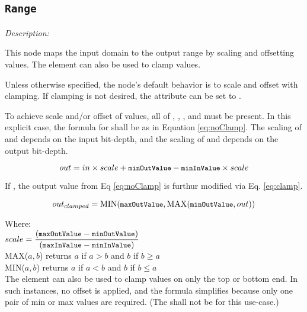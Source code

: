 \subsection{\texttt{Range}}

\emph{Description:} \par
This node maps the input domain to the output range by scaling and offsetting values. The  element can also be used to clamp values.

Unless otherwise specified, the node's default behavior is to scale and offset with clamping. If clamping is not desired, the  attribute can be set to .

To achieve scale and/or offset of values, all of , , , and  must be present. In this explicit case, the formula for  shall be as in Equation \ref{eq:noClamp}. The scaling of  and  depends on the input bit-depth, and the scaling of  and  depends on the output bit-depth.

\begin{equation}\label{eq:noClamp}
    out = in \times scale + {\small \texttt{minOutValue}} - {\small \texttt{minInValue}} \times scale
\end{equation}

If , the output value from Eq \ref{eq:noClamp} is furthur modified via Eq. \ref{eq:clamp}.

\begin{equation}\label{eq:clamp}
    out_{clamped} = \mathrm{MIN}({\small \texttt{maxOutValue}}, \mathrm{MAX}( {\small \texttt{minOutValue}}, out))
\end{equation}

\tabto{0.25in} Where: \\[6pt]
\tabto{0.5in} $scale = \dfrac{({\small \texttt{maxOutValue}} - {\small \texttt{minOutValue}})}{({\small \texttt{maxInValue}} - {\small \texttt{minInValue}})}$ \\[12pt]
\tabto{0.5in} MAX(${a,b}$) returns $a$ if $a > b$ and $b$ if $b \geq a$ \\[6pt]
\tabto{0.5in} MIN(${a,b}$) returns $a$ if $a < b$ and $b$ if $b \leq a$ \\[10pt]

The  element can also be used to clamp values on only the top or bottom end. In such instances, no offset is applied, and the formula simplifies because only one pair of min or max values are required. (The  shall not be  for this use-case.)

